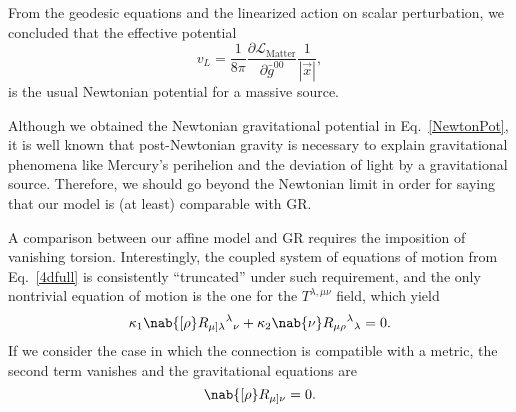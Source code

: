 \documentclass[aps,prl,twocolumn,superscriptaddress,showpacs,showkeys]{revtex4-1}
\begin{document}

From the geodesic equations and the linearized action on scalar perturbation, we concluded that the effective potential
\begin{equation}
  \label{NewtonPot}
  v_L = \frac{1}{8\pi} \frac{ \partial\mathcal{L}_{\text{Matter}} }{ \partial \bar{g}^{00} } \frac{1}{|\vec{x}|},
\end{equation}
is the usual Newtonian potential for a massive source.

Although we obtained the Newtonian gravitational potential in Eq.~\eqref{NewtonPot}, it is well known that post-Newtonian gravity is necessary to explain gravitational phenomena like Mercury's perihelion and the deviation of light by a gravitational source. Therefore, we should go beyond the Newtonian limit in order for saying that our model is (at least) comparable with GR.

A comparison between our affine model and GR requires the imposition of vanishing torsion. Interestingly, the coupled system of equations of motion from Eq.~\eqref{4dfull} is consistently ``truncated'' under such requirement, and the only nontrivial equation of motion is the one for the $T^{\lambda,\mu\nu}$ field, which yield
\begin{equation*}
  \kappa_1 \nab{[\rho} R_{\mu]\lambda}{}^{\lambda}{}_{\nu} + \kappa_2 \nab{\nu} R_{\mu\rho}{}^\lambda{}_\lambda = 0.
\end{equation*}
If we consider the case in which the connection is compatible with a metric, the second term vanishes and the gravitational equations are
\begin{equation}
  \nab{[\rho} R_{\mu]\nu} = 0.
  \label{SimpleEOM}
\end{equation}
\end{document}
